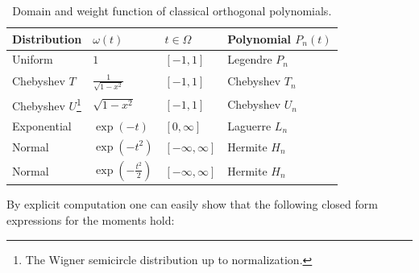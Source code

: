 \documentclass[a4paper,10pt]{article}
\begin{document}
\begin{savenotes}
\begin{table}[h!]
  \centering
  \begin{tabular}{|l|l|l|l|}
    \hline
    Distribution  & $\omega(t)$    & $t \in \Omega$      & Polynomial $P_n(t)$ \\
    \hline
    Uniform       & $1$            & $[-1, 1]$           & Legendre $P_n$ \\
    Chebyshev $T$ & $\frac{1}{\sqrt{1-x^2}}$ & $[-1, 1]$ & Chebyshev $T_n$ \\
    Chebyshev $U$\footnote{The Wigner semicircle distribution up to normalization.}
                  & $\sqrt{1-x^2}$ & $[-1, 1]$           & Chebyshev $U_n$ \\
    Exponential   & $\exp(-t)$     & $[0, \infty]$       & Laguerre $L_n$ \\
    Normal        & $\exp(-t^2)$   & $[-\infty, \infty]$ & Hermite $H_n$ \\
    Normal        & $\exp\!\left(-\frac{t^2}{2}\right)$
                  & $[-\infty, \infty]$                  & Hermite $H_n$ \\
    \hline
  \end{tabular}
  \caption{\label{eq:orthogonal_polynomials}
  Domain and weight function of classical orthogonal polynomials.}
\end{table}
\end{savenotes}

By explicit computation one can easily show that the following closed
form expressions for the moments hold:
\end{document}
